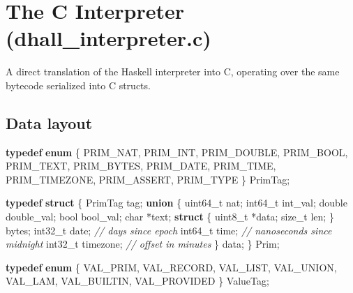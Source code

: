 \documentclass[]{article}
\newenvironment{Shaded}{}{}
\newcommand{\CommentTok}[1]{\textcolor[rgb]{0.38,0.63,0.69}{\textit{#1}}}
\newcommand{\DataTypeTok}[1]{\textcolor[rgb]{0.56,0.13,0.00}{#1}}
\newcommand{\KeywordTok}[1]{\textcolor[rgb]{0.00,0.44,0.13}{\textbf{#1}}}
\newcommand{\NormalTok}[1]{#1}
\newcommand{\OperatorTok}[1]{\textcolor[rgb]{0.40,0.40,0.40}{#1}}
\begin{document}
\section{The C Interpreter
(dhall\_interpreter.c)}\label{the-c-interpreter-dhall_interpreter.c}

A direct translation of the Haskell interpreter into C, operating over the same
bytecode serialized into C structs.

\subsection{Data layout}\label{data-layout}

\begin{Shaded}
\begin{Highlighting}[]
\KeywordTok{typedef} \KeywordTok{enum} \OperatorTok{\{}
\NormalTok{  PRIM\_NAT}\OperatorTok{,}\NormalTok{ PRIM\_INT}\OperatorTok{,}\NormalTok{ PRIM\_DOUBLE}\OperatorTok{,}\NormalTok{ PRIM\_BOOL}\OperatorTok{,}\NormalTok{ PRIM\_TEXT}\OperatorTok{,}
\NormalTok{  PRIM\_BYTES}\OperatorTok{,}\NormalTok{ PRIM\_DATE}\OperatorTok{,}\NormalTok{ PRIM\_TIME}\OperatorTok{,}\NormalTok{ PRIM\_TIMEZONE}\OperatorTok{,}\NormalTok{ PRIM\_ASSERT}\OperatorTok{,}\NormalTok{ PRIM\_TYPE}
\OperatorTok{\}}\NormalTok{ PrimTag}\OperatorTok{;}

\KeywordTok{typedef} \KeywordTok{struct} \OperatorTok{\{}
\NormalTok{  PrimTag tag}\OperatorTok{;}
  \KeywordTok{union} \OperatorTok{\{}
    \DataTypeTok{uint64\_t}\NormalTok{ nat}\OperatorTok{;}
    \DataTypeTok{int64\_t}\NormalTok{ int\_val}\OperatorTok{;}
    \DataTypeTok{double}\NormalTok{ double\_val}\OperatorTok{;}
    \DataTypeTok{bool}\NormalTok{ bool\_val}\OperatorTok{;}
    \DataTypeTok{char} \OperatorTok{*}\NormalTok{text}\OperatorTok{;}
    \KeywordTok{struct} \OperatorTok{\{} \DataTypeTok{uint8\_t} \OperatorTok{*}\NormalTok{data}\OperatorTok{;} \DataTypeTok{size\_t}\NormalTok{ len}\OperatorTok{;} \OperatorTok{\}}\NormalTok{ bytes}\OperatorTok{;}
    \DataTypeTok{int32\_t}\NormalTok{ date}\OperatorTok{;}      \CommentTok{// days since epoch}
    \DataTypeTok{int64\_t}\NormalTok{ time}\OperatorTok{;}      \CommentTok{// nanoseconds since midnight}
    \DataTypeTok{int32\_t}\NormalTok{ timezone}\OperatorTok{;}  \CommentTok{// offset in minutes}
  \OperatorTok{\}}\NormalTok{ data}\OperatorTok{;}
\OperatorTok{\}}\NormalTok{ Prim}\OperatorTok{;}

\KeywordTok{typedef} \KeywordTok{enum} \OperatorTok{\{}
\NormalTok{  VAL\_PRIM}\OperatorTok{,}\NormalTok{ VAL\_RECORD}\OperatorTok{,}\NormalTok{ VAL\_LIST}\OperatorTok{,}\NormalTok{ VAL\_UNION}\OperatorTok{,}
\NormalTok{  VAL\_LAM}\OperatorTok{,}\NormalTok{ VAL\_BUILTIN}\OperatorTok{,}\NormalTok{ VAL\_PROVIDED}
\OperatorTok{\}}\NormalTok{ ValueTag}\OperatorTok{;}


\end{Highlighting}
\end{Shaded}
\end{document}
